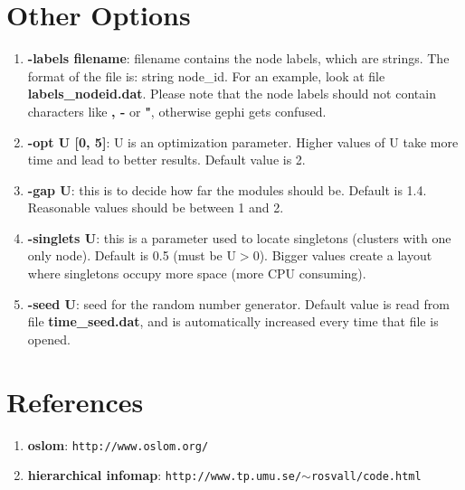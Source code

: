 \documentclass[11pt]{article}
\begin{document}
\section{Other Options}

\begin{enumerate}
  \item \textbf{-labels filename}: filename contains the node labels, which are strings. The format of the file is: string node\_id. For an example, look at file \textbf{labels\_nodeid.dat}. Please note that the node labels should not contain characters like \textbf{, -} or \textbf{"}, otherwise gephi gets confused. 
  \item \textbf{-opt U [0, 5]}: U is an optimization parameter. Higher values of U take more time and lead to better results. Default value is 2.  
    \item \textbf{-gap U}: this is to decide how far the modules should be. Default is 1.4. Reasonable values should be between 1 and 2.
      \item \textbf{-singlets U}: this is a parameter used to locate singletons (clusters with one only node). Default is 0.5 (must be U$> 0$). Bigger values create a layout where singletons occupy more space (more CPU consuming).
 \item \textbf{-seed U}: seed for the random number generator. Default value is read from file \textbf{time\_seed.dat}, and is automatically increased every time that file is opened.
\end{enumerate}


\section{References}



\begin{enumerate}

  \item \textbf{oslom}: { \tt http://www.oslom.org/}
  \item \textbf{hierarchical infomap}: {\tt http://www.tp.umu.se/$\sim$rosvall/code.html}
\end{enumerate}
\end{document}
